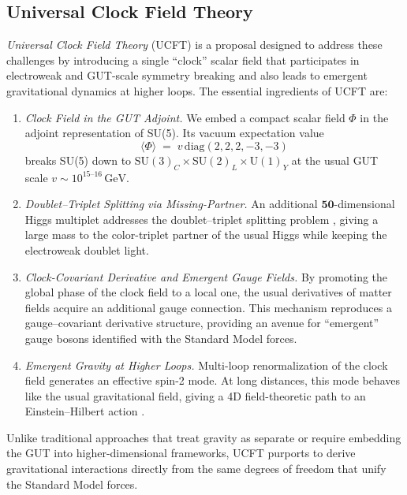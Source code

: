 \documentclass[aps,prd,preprint,groupedaddress]{revtex4-2}
\begin{document}
\subsection{Universal Clock Field Theory}
\emph{Universal Clock Field Theory} (UCFT) is a proposal designed to address these challenges by introducing a single “clock” scalar field that participates in electroweak and GUT-scale symmetry breaking and also leads to emergent gravitational dynamics at higher loops.  The essential ingredients of UCFT are:
\begin{enumerate}
    \item \emph{Clock Field in the GUT Adjoint.}  We embed a compact scalar field $\Phi$ in the adjoint representation of SU(5).  Its vacuum expectation value
    \[
    \langle \Phi \rangle \;=\; v\,\mathrm{diag}(2,2,2,-3,-3)
    \]
    breaks SU(5) down to $\mathrm{SU}(3)_C \times \mathrm{SU}(2)_L \times \mathrm{U}(1)_Y$ at the usual GUT scale $v \sim 10^{15\text{--}16}\,\mathrm{GeV}$.  

    \item \emph{Doublet--Triplet Splitting via Missing-Partner.}  An additional $\mathbf{50}$-dimensional Higgs multiplet addresses the doublet--triplet splitting problem \cite{dimopoulos1982missing}, giving a large mass to the color-triplet partner of the usual Higgs while keeping the electroweak doublet light.

    \item \emph{Clock-Covariant Derivative and Emergent Gauge Fields.}  By promoting the global phase of the clock field to a local one, the usual derivatives of matter fields acquire an additional gauge connection.  This mechanism reproduces a gauge–covariant derivative structure, providing an avenue for “emergent” gauge bosons identified with the Standard Model forces.

    \item \emph{Emergent Gravity at Higher Loops.}  Multi-loop renormalization of the clock field generates an effective spin-2 mode.  At long distances, this mode behaves like the usual gravitational field, giving a 4D field-theoretic path to an Einstein--Hilbert action \cite{weinberg1979ultraviolet,percacci2017asymptotic}.
\end{enumerate}
Unlike traditional approaches that treat gravity as separate or require embedding the GUT into higher-dimensional frameworks, UCFT purports to derive gravitational interactions directly from the same degrees of freedom that unify the Standard Model forces.
\end{document}
